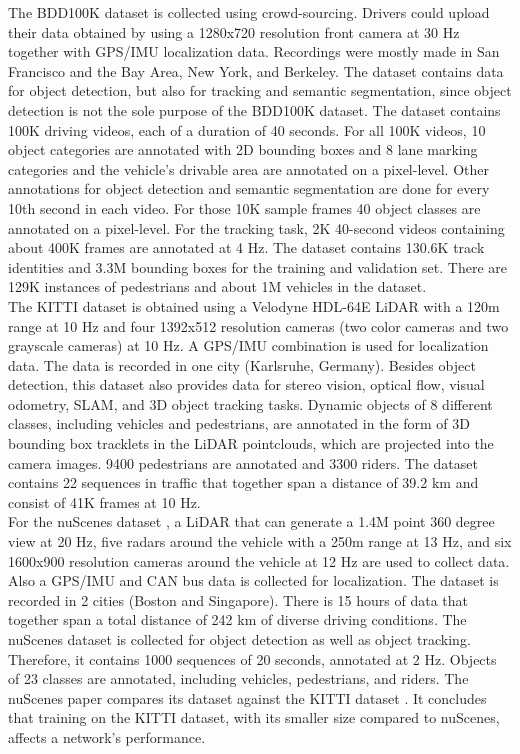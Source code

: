 The \gls{BDD100K} dataset \cite{yu2020bdd100k} is collected using crowd-sourcing. Drivers could upload their data obtained by using a 1280x720 resolution front camera at 30 Hz together with GPS/IMU localization data. Recordings were mostly made in San Francisco and the Bay Area, New York, and Berkeley. The dataset contains data for object detection, but also for tracking and semantic segmentation, since object detection is not the sole purpose of the \gls{BDD100K} dataset. The dataset contains 100K driving videos, each of a duration of 40 seconds. For all 100K videos, 10 object categories are annotated with 2D bounding boxes and 8 lane marking categories and the vehicle's drivable area are annotated on a pixel-level. Other annotations for object detection and semantic segmentation are done for every 10th second in each video. For those 10K sample frames 40 object classes are annotated on a pixel-level. For the tracking task, 2K 40-second videos containing about 400K frames are annotated at 4 Hz. The dataset contains 130.6K track identities and 3.3M bounding boxes for the training and validation set. There are 129K instances of pedestrians and about 1M vehicles in the dataset. \\

The \gls{KITTI} dataset \cite{geiger2012we} is obtained using a Velodyne HDL-64E LiDAR with a 120m range at 10 Hz and four 1392x512 resolution cameras (two color cameras and two grayscale cameras) at 10 Hz. A GPS/IMU combination is used for localization data. The data is recorded in one city (Karlsruhe, Germany). Besides object detection, this dataset also provides data for stereo vision, optical flow, visual odometry, SLAM, and 3D object tracking tasks. Dynamic objects of 8 different classes, including vehicles and pedestrians, are annotated in the form of 3D bounding box tracklets in the LiDAR pointclouds, which are projected into the camera images. 9400 pedestrians are annotated and 3300 riders. The dataset contains 22 sequences in traffic that together span a distance of 39.2 km and consist of 41K frames at 10 Hz. \\

For the nuScenes dataset \cite{caesar2020nuscenes}, a LiDAR that can generate a 1.4M point 360 degree view at 20 Hz, five radars around the vehicle with a 250m range at 13 Hz, and six 1600x900 resolution cameras around the vehicle at 12 Hz are used to collect data. Also a GPS/IMU and CAN bus data is collected for localization. The dataset is recorded in 2 cities (Boston and Singapore). There is 15 hours of data that together span a total distance of 242 km of diverse driving conditions. The nuScenes dataset is collected for object detection as well as object tracking. Therefore, it contains 1000 sequences of 20 seconds, annotated at 2 Hz. Objects of 23 classes are annotated, including vehicles, pedestrians, and riders. The nuScenes paper \cite{caesar2020nuscenes} compares its dataset against the \gls{KITTI} dataset \cite{geiger2012we}. It concludes that training on the \gls{KITTI} dataset, with its smaller size compared to nuScenes, affects a network's performance. \\

